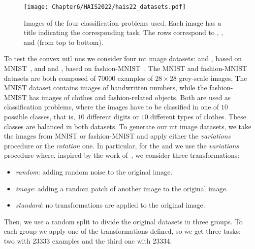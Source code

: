 \begin{figure}[t!]
    \texttt{[image: Chapter6/HAIS2022/hais22\_datasets.pdf]}
    \caption{Images of the four classification problems used. Each image has a title indicating the corresponding task. The rows correspond to , ,  and  (from top to bottom).}
    \label{fig:problems_hais2022}
\end{figure}

To test the convex \acrshort{mtl} \acrshort{nns} we consider four \acrshort{mt} image datasets:
 and , based on MNIST~\citep{LeCunBBH98}, and  and , based on fashion-MNIST~\citep{xiao2017}.
%
The MNIST and fashion-MNIST datasets are both composed of \num{70000} examples of $28\times 28$ grey-scale images. The MNIST dataset contains images of handwritten numbers, while the fashion-MNIST has images of clothes and fashion-related objects.
Both are used as classification problems, where the images have to be classified in one of $10$ possible classes, that is, $10$ different digits or $10$ different types of clothes. These classes are balanced in both datasets.
%
To generate our \acrshort{mt} image datasets, we take the images from MNIST or fashion-MNIST and apply either the \emph{variations} procedure or the \emph{rotation} one.
%
In particular, for the  and  we use the \emph{variations} procedure where, inspired by the work of~\cite{BergstraB12}, we consider three transformations:
\begin{itemize}
    \item \textit{random}: adding random noise to the original image.
    \item \textit{image}: adding a random patch of another image to the original image.
    \item \textit{standard}: no transformations are applied to the original image.
\end{itemize}
Then, we use a random split to divide the original datasets in three groups. To each group we apply one of the transformations defined, so we get three tasks: two with \num{23333} examples and the third one with \num{23334}.

